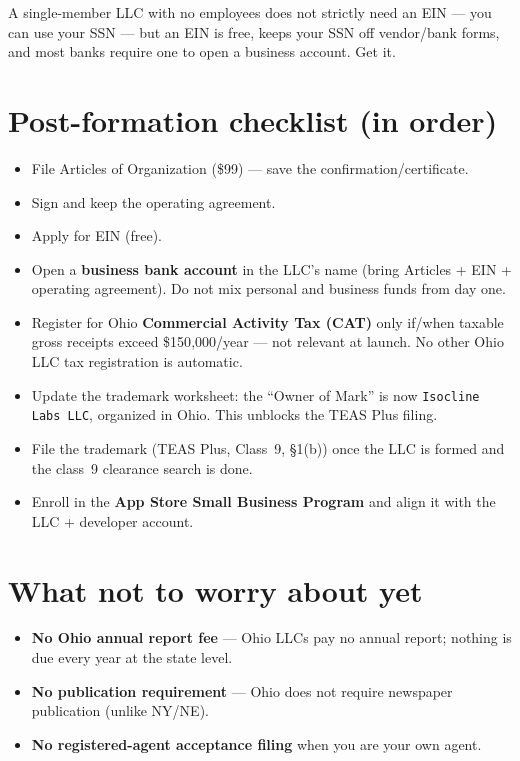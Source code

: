 \documentclass[11pt,a4paper]{article}
\newcommand{\code}[1]{\texttt{\small #1}}
\begin{document}
\noindent
A single-member LLC with no employees does not strictly need an EIN --- you can
use your SSN --- but an EIN is free, keeps your SSN off vendor/bank forms, and
most banks require one to open a business account. Get it.

\section{Post-formation checklist (in order)}

\begin{itemize}[leftmargin=1.4em,itemsep=0.2em]
\item[$\square$] File Articles of Organization (\$99) --- save the
      confirmation/certificate.
\item[$\square$] Sign and keep the operating agreement.
\item[$\square$] Apply for EIN (free).
\item[$\square$] Open a \textbf{business bank account} in the LLC's name (bring
      Articles + EIN + operating agreement). Do not mix personal and business
      funds from day one.
\item[$\square$] Register for Ohio \textbf{Commercial Activity Tax (CAT)} only
      if/when taxable gross receipts exceed \$150{,}000/year --- not relevant at
      launch. No other Ohio LLC tax registration is automatic.
\item[$\square$] Update the trademark worksheet: the ``Owner of Mark'' is now
      \code{Isocline Labs LLC}, organized in Ohio. This unblocks the TEAS Plus
      filing.
\item[$\square$] File the trademark (TEAS Plus, Class~9, \S1(b)) once the LLC
      is formed and the class~9 clearance search is done.
\item[$\square$] Enroll in the \textbf{App Store Small Business Program} and
      align it with the LLC + developer account.
\end{itemize}

\section{What not to worry about yet}

\begin{itemize}[leftmargin=1.4em,itemsep=0.1em]
\item \textbf{No Ohio annual report fee} --- Ohio LLCs pay no annual report;
      nothing is due every year at the state level.
\item \textbf{No publication requirement} --- Ohio does not require newspaper
      publication (unlike NY/NE).
\item \textbf{No registered-agent acceptance filing} when you are your own
      agent.
\end{itemize}
\end{document}

